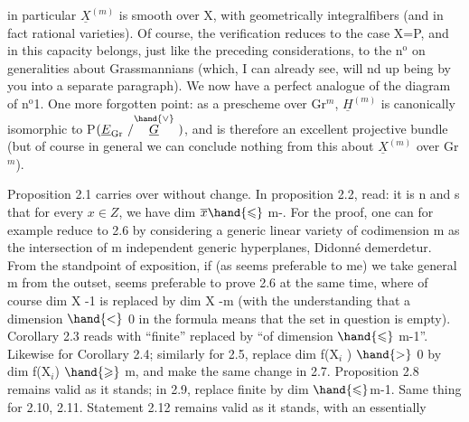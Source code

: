 
in particular $\underline{X}^{(m)}$ is smooth over X, with geometrically integral\hand{/}fibers
(and in fact rational varieties). Of course, the
verification reduces to the case X=P, and in this capacity belongs, just
like the preceding considerations, to the n$^{\text{o}}$ on generalities about
Grassmannians (which, I can already see, will nd up being 
by you into a separate paragraph). We now have
a perfect analogue of the diagram of n$^{\text{o}}$1. One more forgotten point:
as a prescheme over Gr$^{m}$, $\underline{H}^{(m)}$ is canonically
isomorphic to P$(\underline{E}_{\mathrm{Gr}}\ /\overset{\hand{\vee}}{\underline{G}}\ )$, and is therefore an excellent projective bundle
(but of course in general we can conclude nothing from this about $\underline{X}^{(m)}$ over
Gr$^{m}$).

Proposition 2.1 carries over without change. In
proposition 2.2, read: it is n and s that for every $x \in Z$, we
have  dim $\overline{x} \hand{\leqslant}$ m-. For the proof, one can for example
reduce to 2.6 by considering a generic linear  variety
of codimension m as the intersection of m independent generic hyperplanes,
Didonné demerdetur. From the standpoint of exposition, if
(as seems preferable to me) we take general m from the outset, 
seems preferable to prove 2.6 at the same time, where of course
dim X -1 is replaced by dim X -m (with the understanding that a dimension
$\hand{<}$ 0 in the formula means that the set in question is empty).
Corollary 2.3 reads with “finite” replaced by “of dimension $\hand{\leqslant}$ 
m-1”. Likewise for Corollary 2.4; similarly for 2.5, replace
dim f(X$_{i}$ ) $\hand{>}$ 0 by dim f(X$_{i}$) $\hand{\geqslant}$ m, and make the same change in 2.7.
Proposition 2.8 remains valid as it stands; in 2.9, replace
finite by dim $\hand{\leqslant}$m-1. Same thing for 2.10, 2.11. Statement
2.12 remains valid as it stands, with an essentially

